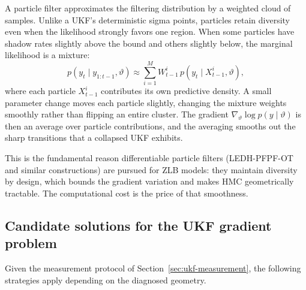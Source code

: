 \documentclass[11pt]{article}
\begin{document}
A particle filter approximates the filtering distribution by a weighted cloud
of samples. Unlike a UKF's deterministic sigma points, particles retain
diversity even when the likelihood strongly favors one region. When some
particles have shadow rates slightly above the bound and others slightly below,
the marginal likelihood is a mixture:
\[
 p(y_t\mid y_{1:t-1},\vartheta)
 \approx \sum_{i=1}^M W_{t-1}^i\, p(y_t\mid X_{t-1}^i,\vartheta),
\]
where each particle $X_{t-1}^i$ contributes its own predictive density. A
small parameter change moves each particle slightly, changing the mixture
weights smoothly rather than flipping an entire cluster. The gradient
$\nabla_\vartheta\log p(y\mid\vartheta)$ is then an average over particle
contributions, and the averaging smooths out the sharp transitions that a
collapsed UKF exhibits.

This is the fundamental reason differentiable particle filters (LEDH-PFPF-OT
and similar constructions) are pursued for ZLB models: they maintain diversity
by design, which bounds the gradient variation and makes HMC geometrically
tractable. The computational cost is the price of that smoothness.

\subsection{Candidate solutions for the UKF gradient problem}\label{sec:ukf-solutions}

Given the measurement protocol of Section~\ref{sec:ukf-measurement}, the
following strategies apply depending on the diagnosed geometry.
\end{document}
